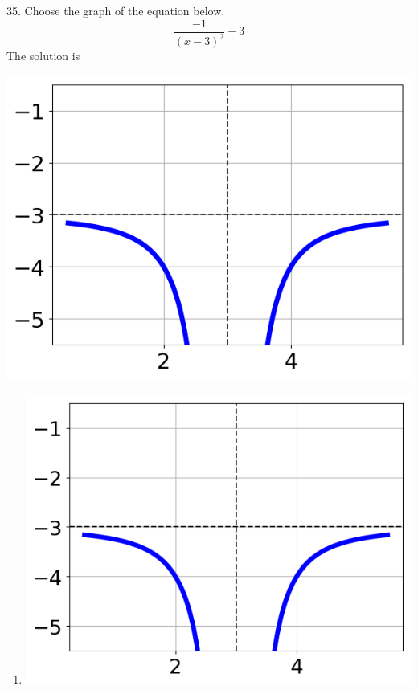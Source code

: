 \documentclass{article}[10pt]
\begin{document}
35. Choose the graph of the equation below.
$$ \frac{-1}{(x - 3)^2} - 3 $$ 
The solution is  
\begin{center}\includegraphics[scale=0.5]{../Figures/question35CD.png}\end{center}\begin{enumerate}[label=\Alph*.] 
\item  
\begin{center}\includegraphics[scale=0.5]{../Figures/question35CD.png}\end{center} 
 

\end{enumerate}
\end{document}
